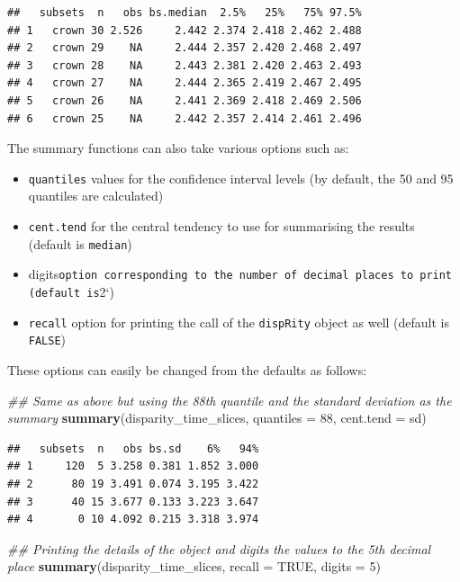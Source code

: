 \documentclass[]{book}
\newenvironment{Shaded}{\begin{snugshade}}{\end{snugshade}}
\newcommand{\CommentTok}[1]{\textcolor[rgb]{0.56,0.35,0.01}{\textit{#1}}}
\newcommand{\DataTypeTok}[1]{\textcolor[rgb]{0.13,0.29,0.53}{#1}}
\newcommand{\DecValTok}[1]{\textcolor[rgb]{0.00,0.00,0.81}{#1}}
\newcommand{\KeywordTok}[1]{\textcolor[rgb]{0.13,0.29,0.53}{\textbf{#1}}}
\newcommand{\NormalTok}[1]{#1}
\newcommand{\OtherTok}[1]{\textcolor[rgb]{0.56,0.35,0.01}{#1}}
\providecommand{\tightlist}{%
  \setlength{\itemsep}{0pt}\setlength{\parskip}{0pt}}
\begin{document}
\begin{verbatim}
##   subsets  n   obs bs.median  2.5%   25%   75% 97.5%
## 1   crown 30 2.526     2.442 2.374 2.418 2.462 2.488
## 2   crown 29    NA     2.444 2.357 2.420 2.468 2.497
## 3   crown 28    NA     2.443 2.381 2.420 2.463 2.493
## 4   crown 27    NA     2.444 2.365 2.419 2.467 2.495
## 5   crown 26    NA     2.441 2.369 2.418 2.469 2.506
## 6   crown 25    NA     2.442 2.357 2.414 2.461 2.496
\end{verbatim}

The summary functions can also take various options such as:

\begin{itemize}
\tightlist
\item
  \texttt{quantiles} values for the confidence interval levels (by default, the 50 and 95 quantiles are calculated)
\item
  \texttt{cent.tend} for the central tendency to use for summarising the results (default is \texttt{median})
\item
  digits\texttt{option\ corresponding\ to\ the\ number\ of\ decimal\ places\ to\ print\ (default\ is}2`)
\item
  \texttt{recall} option for printing the call of the \texttt{dispRity} object as well (default is \texttt{FALSE})
\end{itemize}

These options can easily be changed from the defaults as follows:

\begin{Shaded}
\begin{Highlighting}[]
\CommentTok{## Same as above but using the 88th quantile and the standard deviation as the summary }
\KeywordTok{summary}\NormalTok{(disparity_time_slices, }\DataTypeTok{quantiles =} \DecValTok{88}\NormalTok{, }\DataTypeTok{cent.tend =}\NormalTok{ sd)}
\end{Highlighting}
\end{Shaded}

\begin{verbatim}
##   subsets  n   obs bs.sd    6%   94%
## 1     120  5 3.258 0.381 1.852 3.000
## 2      80 19 3.491 0.074 3.195 3.422
## 3      40 15 3.677 0.133 3.223 3.647
## 4       0 10 4.092 0.215 3.318 3.974
\end{verbatim}

\begin{Shaded}
\begin{Highlighting}[]
\CommentTok{## Printing the details of the object and digits the values to the 5th decimal place}
\KeywordTok{summary}\NormalTok{(disparity_time_slices, }\DataTypeTok{recall =} \OtherTok{TRUE}\NormalTok{, }\DataTypeTok{digits =} \DecValTok{5}\NormalTok{)}
\end{Highlighting}
\end{Shaded}
\end{document}
